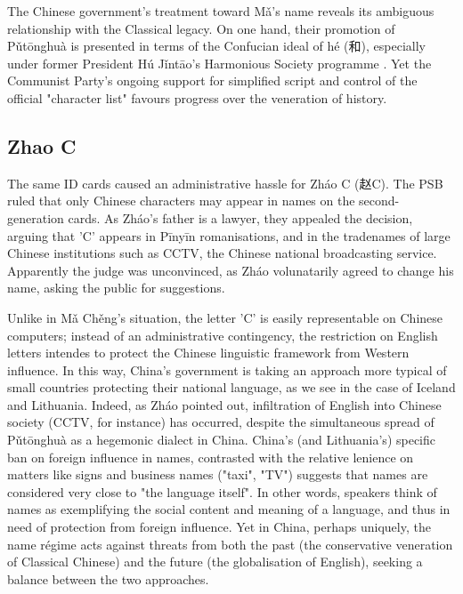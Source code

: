 The Chinese government's treatment toward Mǎ's name reveals its ambiguous
relationship with the Classical legacy. On one hand, their promotion of
Pǔtōnghuà is presented in terms of the Confucian ideal of hé ({\zafont 和}),
especially under former President Hú Jǐntāo's Harmonious Society programme
\parencite{wang16}. Yet the Communist Party's ongoing support for simplified
script and control of the official "character list" favours progress over the
veneration of history.

\subsection{Zhao C}

The same ID cards caused an administrative hassle for Zháo C ({\zafont 赵}C). The
PSB ruled that only Chinese characters may appear in names on the
second-generation cards. As Zháo's father is a lawyer, they appealed the
decision, arguing that 'C' appears in Pīnyīn romanisations, and in the
tradenames of large Chinese institutions such as CCTV, the Chinese national
broadcasting service. Apparently the judge was unconvinced, as Zháo volunatarily
agreed to change his name, asking the public for suggestions.

Unlike in Mǎ Chěng's situation, the letter 'C' is easily representable on
Chinese computers; instead of an administrative contingency, the restriction on
English letters intendes to protect the Chinese linguistic framework from
Western influence. In this way, China's government is taking an approach more
typical of small countries protecting their national language, as we see in the
case of Iceland and Lithuania. Indeed, as Zháo pointed out, infiltration of
English into Chinese society (CCTV, for instance) has occurred, despite the
simultaneous spread of Pǔtōnghuà as a hegemonic dialect in China. China's (and
Lithuania's) specific ban on foreign influence in names, contrasted with the
relative lenience on matters like signs and business names ("taxi", "TV")
suggests that names are considered very close to "the language itself". In other
words, speakers think of names as exemplifying the social content and meaning of
a language, and thus in need of protection from foreign influence. Yet in China,
perhaps uniquely, the name régime acts against threats from both the past (the
conservative veneration of Classical Chinese) and the future (the globalisation
of English), seeking a balance between the two approaches.


